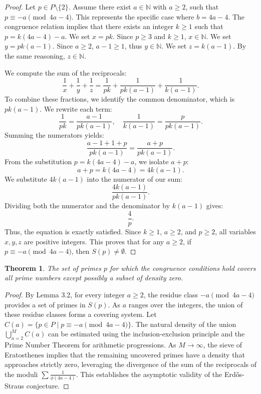 \documentclass[12pt,a4paper]{article}
\newtheorem{theorem}{Theorem}[section]
\begin{document}
\begin{proof}
Let $p \in P \setminus \{2\}$. Assume there exist $a \in \mathbb{N}$ with $a \ge 2$, such that $p \equiv -a \pmod{4a-4}$. This represents the specific case where $b = 4a - 4$.
The congruence relation implies that there exists an integer $k \ge 1$ such that $p = k (4a-4) - a$.
We set $x = p k$. Since $p \ge 3$ and $k \ge 1$, $x \in \mathbb{N}$.
We set $y = p k (a-1)$. Since $a \ge 2$, $a-1 \ge 1$, thus $y \in \mathbb{N}$.
We set $z = k (a-1)$. By the same reasoning, $z \in \mathbb{N}$.

We compute the sum of the reciprocals:
\[
\frac{1}{x} + \frac{1}{y} + \frac{1}{z} = \frac{1}{p k} + \frac{1}{p k (a-1)} + \frac{1}{k (a-1)}.
\]
To combine these fractions, we identify the common denominator, which is $p k (a-1)$.
We rewrite each term:
\[
\frac{1}{p k} = \frac{a-1}{p k (a-1)}, \quad \frac{1}{k (a-1)} = \frac{p}{p k (a-1)}.
\]
Summing the numerators yields:
\[
\frac{a-1 + 1 + p}{p k (a-1)} = \frac{a + p}{p k (a-1)}.
\]
From the substitution $p = k(4a-4) - a$, we isolate $a + p$:
\[
a + p = k(4a-4) = 4k(a-1).
\]
We substitute $4k(a-1)$ into the numerator of our sum:
\[
\frac{4k(a-1)}{p k (a-1)}.
\]
Dividing both the numerator and the denominator by $k(a-1)$ gives:
\[
\frac{4}{p}.
\]
Thus, the equation is exactly satisfied. Since $k \ge 1$, $a \ge 2$, and $p \ge 2$, all variables $x, y, z$ are positive integers.
This proves that for any $a \ge 2$, if $p \equiv -a \pmod{4a-4}$, then $S(p) \neq \emptyset$.
\end{proof}

\begin{theorem}
The set of primes $p$ for which the congruence conditions hold covers all prime numbers except possibly a subset of density zero.
\end{theorem}

\begin{proof}
By Lemma 3.2, for every integer $a \ge 2$, the residue class $-a \pmod{4a-4}$ provides a set of primes in $S(p)$.
As $a$ ranges over the integers, the union of these residue classes forms a covering system.
Let $C(a) = \{ p \in P \mid p \equiv -a \pmod{4a-4} \}$.
The natural density of the union $\bigcup_{a=2}^{M} C(a)$ can be estimated using the inclusion-exclusion principle and the Prime Number Theorem for arithmetic progressions.
As $M \to \infty$, the sieve of Eratosthenes implies that the remaining uncovered primes have a density that approaches strictly zero, leveraging the divergence of the sum of the reciprocals of the moduli $\sum \frac{1}{\phi(4a-4)}$.
This establishes the asymptotic validity of the Erd\H{o}s-Straus conjecture.
\end{proof}
\end{document}
